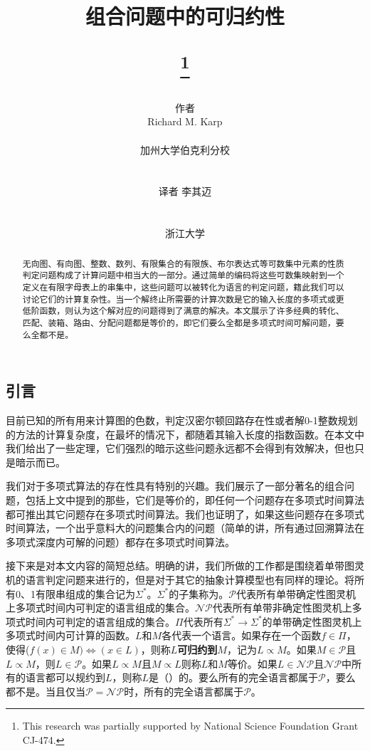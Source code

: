 \documentclass[twocolumn]{article}
\title{
    \begin{CJK}{UTF8}{gbsn}
    组合问题中的可归约性
    \end{CJK}
    \thanks{This research was partially supported by National Science Foundation Grant CJ-474.}
}
\author{
    \begin{CJK}{UTF8}{gbsn}
    作者
    \end{CJK}
    Richard M. Karp\\
    \begin{CJK}{UTF8}{gbsn}
    加州大学伯克利分校
    \end{CJK}
    \\
    \begin{CJK}{UTF8}{gbsn}
    译者 李其迈
    \end{CJK}
    \\
    \begin{CJK}{UTF8}{gbsn}
    浙江大学
    \end{CJK}
}
\date{}
\theoremstyle{nonumberplain}%
\begin{document}
\maketitle

\begin{CJK}{UTF8}{gbsn}
\begin{abstract}
无向图、有向图、整数、数列、有限集合的有限族、布尔表达式等可数集中元素的性质判定问题构成了计算问题中相当大的一部分。通过简单的编码将这些可数集映射到一个定义在有限字母表上的串集中，这些问题可以被转化为语言的判定问题，籍此我们可以讨论它们的计算复杂性。当一个解终止所需要的计算次数是它的输入长度的多项式或更低阶函数，则认为这个解对应的问题得到了满意的解决。本文展示了许多经典的转化、匹配、装箱、路由、分配问题都是等价的，即它们要么全都是多项式时间可解问题，要么全都不是。
\end{abstract}

\section{引言}

    目前已知的所有用来计算图的色数，判定汉密尔顿回路存在性或者解0-1整数规划的方法的计算复杂度，在最坏的情况下，都随着其输入长度的指数函数。在本文中我们给出了一些定理，它们强烈的暗示这些问题永远都不会得到有效解决，但也只是暗示而已。

    我们对于多项式算法的存在性具有特别的兴趣。我们展示了一部分著名的组合问题，包括上文中提到的那些，它们是等价的，即任何一个问题存在多项式时间算法都可推出其它问题存在多项式时间算法。我们也证明了，如果这些问题存在多项式时间算法，一个出乎意料大的问题集合内的问题（简单的讲，所有通过回溯算法在多项式深度内可解的问题）都存在多项式时间算法。

    接下来是对本文内容的简短总结。明确的讲，我们所做的工作都是围绕着单带图灵机的语言判定问题来进行的，但是对于其它的抽象计算模型也有同样的理论。将所有0、1有限串组成的集合记为$\Sigma^*$。$\Sigma^*$的子集称为{}。$\mathcal{P}$代表所有单带确定性图灵机上多项式时间内可判定的语言组成的集合。$\mathcal{NP}$代表所有单带非确定性图灵机上多项式时间内可判定的语言组成的集合。$\Pi$代表所有$\Sigma^*\to\Sigma^*$的单带确定性图灵机上多项式时间内可计算的函数。$L$和$M$各代表一个语言。如果存在一个函数$f\in\Pi$，使得($f(x)\in M)\Leftrightarrow(x\in L)$，则称$L${\bf 可归约到}$M$，记为$L\propto M$。如果$M\in\mathcal{P}$且$L\propto M$，则$L\in\mathcal{P}$。如果$L\propto M$且$M\propto L$则称$L$和$M$等价。如果$L\in\mathcal{NP}$且$\mathcal{NP}$中所有的语言都可以规约到$L$，则称$L$是（{}）{}的。要么所有的完全语言都属于$\mathcal{P}$，要么都不是。当且仅当$\mathcal{P} = \mathcal{NP}$时，所有的完全语言都属于$\mathcal{P}$。


\end{CJK}
\end{document}
